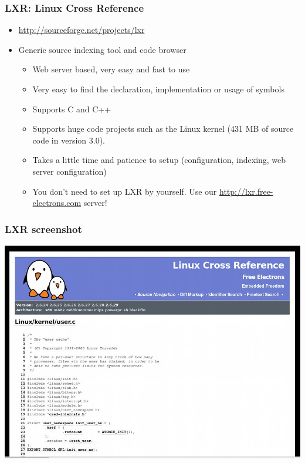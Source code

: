 \begin{frame}
  \frametitle{LXR: Linux Cross Reference}
  \begin{itemize}
  \item \url{http://sourceforge.net/projects/lxr}
  \item Generic source indexing tool and code browser
    \begin{itemize}
    \item Web server based, very easy and fast to use
    \item Very easy to find the declaration, implementation or usage
      of symbols
    \item Supports C and C++
    \item Supports huge code projects such as the Linux kernel (431 MB
      of source code in version 3.0).
    \item Takes a little time and patience to setup (configuration,
      indexing, web server configuration)
    \item You don't need to set up LXR by yourself. Use our
      \url{http://lxr.free-electrons.com} server!
    \end{itemize}
  \end{itemize}
\end{frame}

\begin{frame}
  \frametitle{LXR screenshot}
  \begin{center}
    \includegraphics[width=\textwidth]{slides/kernel-source-code-management/lxr.png}
  \end{center}
\end{frame}

